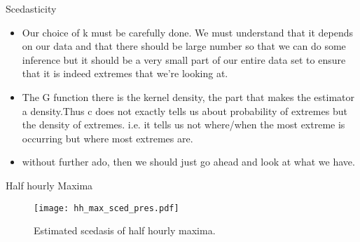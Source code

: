 \documentclass[notes]{beamer}
\begin{document}
\begin{frame}{Scedasticity}
{\begin{itemize}
\item Our choice of k must be carefully done. We must understand that it depends on our data and that there should be large number so that we can do some inference but it should be a very small part of our entire data set to ensure that it is indeed extremes that we're looking at.
\item The G function there is the kernel density, the part that makes the estimator a density.Thus c does not exactly tells us about probability of extremes but the density of extremes. i.e. it tells us not where/when the most extreme is occurring but where most extremes are.
\item without further ado, then we should just go ahead and look at what we have. \end{itemize}}
\end{frame}


\begin{frame}{Half hourly Maxima}
\begin{figure}
\centering
\texttt{[image: hh\_max\_sced\_pres.pdf]}
\caption{Estimated scedasis of half hourly maxima.}
\label{fig:hh_max_sced} 
\end{figure}
\end{frame}

\end{document}
